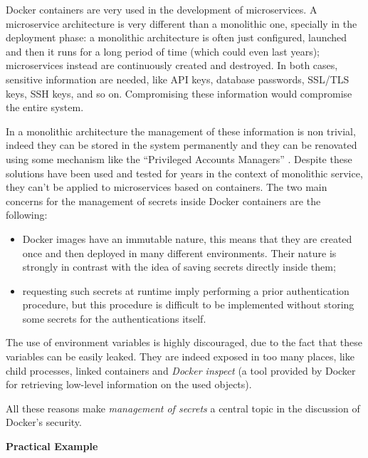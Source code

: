 \documentclass[a4paper,12pt]{article}
\begin{document}
Docker containers are very used in the development of microservices. A
microservice architecture is very different than a monolithic one, specially in
the deployment phase: a monolithic architecture is often just configured,
launched and then it runs for a long period of time (which could even last
years); microservices instead are continuously created and destroyed. In both
cases, sensitive information are needed, like API keys, database passwords,
SSL/TLS keys, SSH keys, and so on. Compromising these information would
compromise the entire system. \par In a monolithic architecture the management
of these information is non trivial, indeed they can be stored in the system
permanently and they can be renovated using some mechanism like the ``Privileged
Accounts Managers'' \cite{privileged_accounts_managers}. Despite these solutions
have been used and tested for years in the context of monolithic service, they
can't be applied to microservices based on containers. The two main concerns for
the management of secrets inside Docker containers are the
following\cite{secret_management_concerns_docker}:
\begin{itemize}
  \item Docker images have an immutable nature, this means that they are created
  once and then deployed in many different environments. Their nature is
  strongly in contrast with the idea of saving secrets directly inside them;  
  \item requesting such secrets at runtime imply performing a prior
  authentication procedure, but this procedure is difficult to be implemented
  without storing some secrets for the authentications itself.
\end{itemize}
The use of environment variables is highly discouraged, due to the fact that
these variables can be easily leaked. They are indeed exposed in too many
places, like child processes, linked containers and \textit{Docker inspect} (a
tool provided by Docker for retrieving low-level information on the used
objects).\par All these reasons make \textit{management of secrets} a central
topic in the discussion of Docker's security. 

\bigbreak\textbf{Practical Example}\bigbreak 
\end{document}
